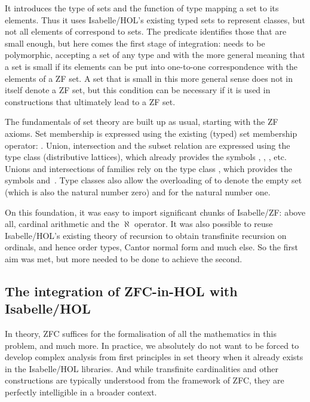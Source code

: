 \documentclass[runningheads]{llncs}
\begin{document}
It introduces the type  of sets and the function  of type  mapping  a set to its elements.
Thus it uses Isabelle/HOL's existing typed sets to represent classes, but not all elements of  correspond to sets.
The predicate  identifies those that are small enough, but here comes the first stage of integration:  needs to be polymorphic, accepting a set of any type and with the more general meaning that a set is small if its elements can be put into one-to-one correspondence with the elements of a ZF set.
A set that is small in this more general sense does not in itself denote a ZF set, but this condition can be necessary if it is used in constructions that ultimately lead to a ZF set.

The fundamentals of set theory are built up as usual, starting with the ZF axioms.
Set membership is expressed using the existing (typed) set membership operator: .
Union, intersection and the subset relation are expressed using the type class  (distributive lattices), which already provides the symbols \isa{\isasymsqunion}, \isa{\isasymsqinter}, \isa{\isasymle}, etc.
Unions and intersections of families rely on the type class , which provides the symbols \isa{\isasymSqunion} and~\isa{\isasymSqinter}.
Type classes also allow the overloading of  to denote the empty set (which is also the natural number zero) and  for the natural number one.

On this foundation, it was easy to import significant chunks of Isabelle/ZF: above all, cardinal arithmetic and  the $\aleph$ operator. It was also possible to reuse Isabelle/HOL's existing theory of recursion to obtain transfinite recursion on ordinals, and hence order types, Cantor normal form and much else. So the first aim was met, but more needed to be done to achieve the second.

\subsection{The integration of ZFC-in-HOL with Isabelle/HOL}

In theory, ZFC suffices for the formalisation of all the mathematics in this problem, and much more. In practice, we absolutely do not want to be forced to develop complex analysis from first principles in set theory when it already exists in the Isabelle/HOL libraries. 
And while transfinite cardinalities and other constructions are typically understood from the framework of ZFC, they are perfectly intelligible in a broader context.
\end{document}
